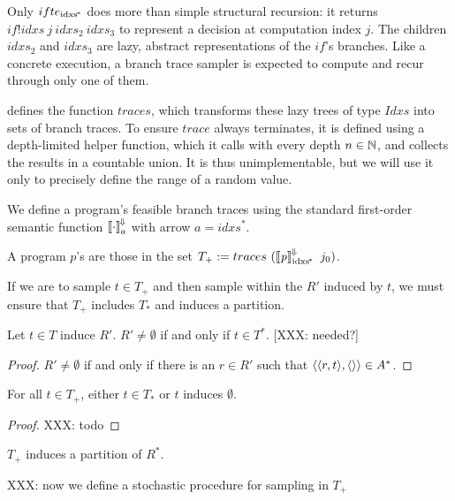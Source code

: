 Only $ifte_\mathrm{idxs^{\mspace{-2mu}*}}$ does more than simple structural recursion: it returns $if!idxs~j~idxs_2~idxs_3$ to represent a decision at computation index $j$.
The children $idxs_2$ and $idxs_3$ are lazy, abstract representations of the $if$'s branches.
Like a concrete execution, a branch trace sampler is expected to compute and recur through only one of them.

 defines the function $traces$, which transforms these lazy trees of type $Idxs$ into sets of branch traces.
To ensure $trace$ always terminates, it is defined using a depth-limited helper function, which it calls with every depth $n \in \mathbb{N}$, and collects the results in a countable union.
It is thus unimplementable, but we will use it only to precisely define the range of a random value.

We define a program's feasible branch traces using the standard first-order semantic function $\left\llbracket{\cdot}\right\rrbracket^{\mspace{-2mu}\Downarrow\mspace{-2mu}}_a$ with arrow $a = idxs^*$.

\begin{definition}
A program $\mathit{p}$'s  are those in the set $T_+ := traces~(\left\llbracket{\mathit{p}}\right\rrbracket^{\mspace{-2mu}\Downarrow\mspace{-2mu}}_\mathrm{idxs^{\mspace{-2mu}*}}~j_0)$.
\end{definition}

If we are to sample $t \in T_+$ and then sample within the $R'$ induced by $t$, we must ensure that $T_+$ includes $T_*$ and induces a partition.

\begin{theorem}
Let $t \in T$ induce $R'$. $R' \neq \emptyset$ if and only if $t \in T^*$. [XXX: needed?]
\end{theorem}
\begin{proof}
$R' \neq \emptyset$ if and only if there is an $r \in R'$ such that $\langle{\langle{r,t}\rangle,\langle{}\rangle}\rangle \in A^*$.
\end{proof}

\begin{theorem}
For all $t \in T_+$, either $t \in T_*$ or $t$ induces $\emptyset$.
\end{theorem}
\begin{proof}
XXX: todo
\end{proof}

\begin{corollary}
$T_+$ induces a partition of $R^*$.
\end{corollary}

XXX: now we define a stochastic procedure for sampling in $T_+$

